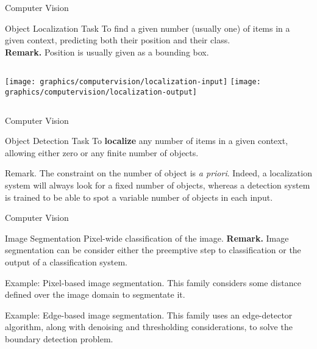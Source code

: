     \begin{frame}{Computer Vision}
        \begin{block}{Object Localization Task}
            To find a given number (usually one) of items in a given context, predicting both their position and their class. \\
            \textbf{Remark.} Position is usually given as a bounding box.
        \end{block}
        \begin{columns}[onlytextwidth]
             {
                \texttt{[image: graphics/computervision/localization-input]}
            }
             {
                \texttt{[image: graphics/computervision/localization-output]}
            }
        \end{columns}
    \end{frame}

    \begin{frame}{Computer Vision}
         {
            \begin{block}{Object Detection Task}
                To \textbf{localize} any number of items in a given context, allowing either zero or any finite number of objects.
            \end{block}
        }
         {
            \begin{alertblock}{Remark.}
                The constraint on the number of object is \emph{a priori}. Indeed, a localization system will always look for a fixed number of objects, whereas a detection system is trained to be able to spot a variable number of objects in each input.
            \end{alertblock}
        }
    \end{frame}

    \begin{frame}{Computer Vision}
         {
            \begin{block}{Image Segmentation}
                Pixel-wide classification of the image. \textbf{Remark.} Image segmentation can be consider either the preemptive step to classification or the output of a classification system.
            \end{block}
        }
         {
            \vskip -0.5cm 
            \begin{exampleblock}{Example: Pixel-based image segmentation.}
                This family considers some distance defined over the image domain to segmentate it.
            \end{exampleblock}
        }
         {
            \vskip -0.5cm 
            \begin{exampleblock}{Example: Edge-based image segmentation.}
                This family uses an edge-detector algorithm, along with denoising and thresholding considerations, to solve the boundary detection problem.
            \end{exampleblock}
        }
    \end{frame}

